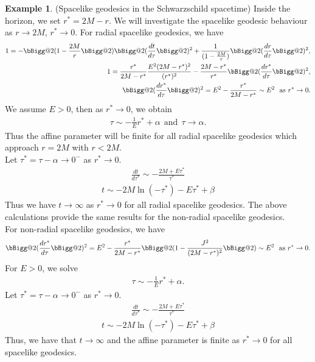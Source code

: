 \documentclass[pdflatex,sn-mathphys-num]{sn-jnl}
\makeatletter
\newcommand{\vast}{\bBigg@{2}}
\theoremstyle{definition}
\newtheorem{ex}[theorem]{Example}
\makeatother
\begin{document}
\begin{ex}(Spacelike geodesics in the Schwarzschild spacetime) Inside the horizon, we set $r^* = 2M -r$. We will investigate the spacelike geodesic behaviour as $r \rightarrow 2M$, $r^* \rightarrow 0$. For radial spacelike geodesics, we have
    \begin{align}
        1 = -\vast(1-\frac{2M}{r}\vast) \vast(\frac{dt}{d \tau}\vast)^2 + \frac{1}{(1-\frac{2M}{r})}\vast(\frac{dr}{d \tau}\vast)^2,\nonumber\\
        1 = \frac{r^*}{2M - r^*}\frac{E^2(2M - r^*)^2}{(r^*)^2} - \frac{2M - r^*}{r^*}\vast(\frac{dr^*}{d \tau}\vast)^2,\nonumber\\\
        \vast(\frac{dr^*}{d \tau}\vast)^2 = E^2 - \frac{r^*}{2M - r^*} \sim E^2~~\text{as}~r^* \rightarrow 0.
    \end{align}
    We assume $E>0$, then as $r^* \rightarrow 0$, we obtain
    \begin{align*}
        \tau \sim -\frac{1}{E}r^* + \alpha ~~\text{and}~~ \tau \rightarrow \alpha . 
    \end{align*}
    Thus the affine parameter will be finite for all radial spacelike geodesics which approach $r = 2M$ with $r < 2M$.\\
    
    \noindent Let $\tau^* = \tau -\alpha \rightarrow 0^-$ as $r^* \rightarrow 0$.
    \begin{align*}
        \frac{dt}{d \tau^*} \sim -\frac{2M + E\tau^*}{\tau^*}
    \end{align*}
    \begin{align}
        t \sim -2M\ln{(-\tau^*)} - E\tau^* + \beta
    \end{align}
    Thus we have $t \rightarrow \infty$ as $r^* \rightarrow 0$ for all radial spacelike geodesics. The above calculations provide the same results for the non-radial spacelike geodesics.\\

    For non-radial spacelike geodesics, we have
    \begin{align*}
        \vast(\frac{dr^*}{d \tau}\vast)^2 = E^2 - \frac{r^*}{2M - r^*}\vast(1 - \frac{J^2}{(2M - r^*)^2}\vast) \sim E^2~~\text{as}~r^* \rightarrow 0.
    \end{align*}
    For $E>0$, we solve
    \begin{align}\label{r expression}
        \tau \sim -\frac{1}{E}r^* + \alpha. 
    \end{align}
    \noindent Let $\tau^* = \tau -\alpha \rightarrow 0^-$ as $r^* \rightarrow 0$.
    \begin{align}
        \frac{dt}{d \tau^*} \sim -\frac{2M + E\tau^*}{\tau^*}
    \end{align}
    \begin{align}\label{t expression}
        t \sim -2M\ln{(-\tau^*)} - E\tau^* + \beta
    \end{align}
    Thus, we have that $t \rightarrow \infty$ and the affine parameter is finite as $r^* \rightarrow 0$ for all spacelike geodesics.\\


\end{ex}
\end{document}
